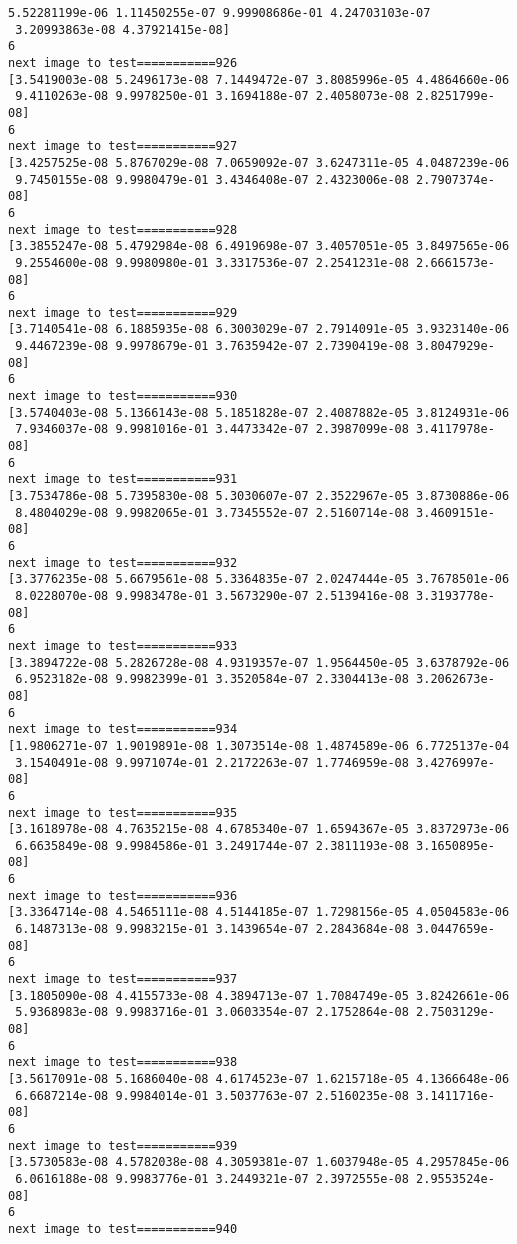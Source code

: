 \documentclass[11pt]{article}
\begin{document}
\begin{Verbatim}[commandchars=\\\{\}]
 5.52281199e-06 1.11450255e-07 9.99908686e-01 4.24703103e-07
 3.20993863e-08 4.37921415e-08]
6
next image to test===========926
[3.5419003e-08 5.2496173e-08 7.1449472e-07 3.8085996e-05 4.4864660e-06
 9.4110263e-08 9.9978250e-01 3.1694188e-07 2.4058073e-08 2.8251799e-08]
6
next image to test===========927
[3.4257525e-08 5.8767029e-08 7.0659092e-07 3.6247311e-05 4.0487239e-06
 9.7450155e-08 9.9980479e-01 3.4346408e-07 2.4323006e-08 2.7907374e-08]
6
next image to test===========928
[3.3855247e-08 5.4792984e-08 6.4919698e-07 3.4057051e-05 3.8497565e-06
 9.2554600e-08 9.9980980e-01 3.3317536e-07 2.2541231e-08 2.6661573e-08]
6
next image to test===========929
[3.7140541e-08 6.1885935e-08 6.3003029e-07 2.7914091e-05 3.9323140e-06
 9.4467239e-08 9.9978679e-01 3.7635942e-07 2.7390419e-08 3.8047929e-08]
6
next image to test===========930
[3.5740403e-08 5.1366143e-08 5.1851828e-07 2.4087882e-05 3.8124931e-06
 7.9346037e-08 9.9981016e-01 3.4473342e-07 2.3987099e-08 3.4117978e-08]
6
next image to test===========931
[3.7534786e-08 5.7395830e-08 5.3030607e-07 2.3522967e-05 3.8730886e-06
 8.4804029e-08 9.9982065e-01 3.7345552e-07 2.5160714e-08 3.4609151e-08]
6
next image to test===========932
[3.3776235e-08 5.6679561e-08 5.3364835e-07 2.0247444e-05 3.7678501e-06
 8.0228070e-08 9.9983478e-01 3.5673290e-07 2.5139416e-08 3.3193778e-08]
6
next image to test===========933
[3.3894722e-08 5.2826728e-08 4.9319357e-07 1.9564450e-05 3.6378792e-06
 6.9523182e-08 9.9982399e-01 3.3520584e-07 2.3304413e-08 3.2062673e-08]
6
next image to test===========934
[1.9806271e-07 1.9019891e-08 1.3073514e-08 1.4874589e-06 6.7725137e-04
 3.1540491e-08 9.9971074e-01 2.2172263e-07 1.7746959e-08 3.4276997e-08]
6
next image to test===========935
[3.1618978e-08 4.7635215e-08 4.6785340e-07 1.6594367e-05 3.8372973e-06
 6.6635849e-08 9.9984586e-01 3.2491744e-07 2.3811193e-08 3.1650895e-08]
6
next image to test===========936
[3.3364714e-08 4.5465111e-08 4.5144185e-07 1.7298156e-05 4.0504583e-06
 6.1487313e-08 9.9983215e-01 3.1439654e-07 2.2843684e-08 3.0447659e-08]
6
next image to test===========937
[3.1805090e-08 4.4155733e-08 4.3894713e-07 1.7084749e-05 3.8242661e-06
 5.9368983e-08 9.9983716e-01 3.0603354e-07 2.1752864e-08 2.7503129e-08]
6
next image to test===========938
[3.5617091e-08 5.1686040e-08 4.6174523e-07 1.6215718e-05 4.1366648e-06
 6.6687214e-08 9.9984014e-01 3.5037763e-07 2.5160235e-08 3.1411716e-08]
6
next image to test===========939
[3.5730583e-08 4.5782038e-08 4.3059381e-07 1.6037948e-05 4.2957845e-06
 6.0616188e-08 9.9983776e-01 3.2449321e-07 2.3972555e-08 2.9553524e-08]
6
next image to test===========940

\end{Verbatim}
\end{document}
